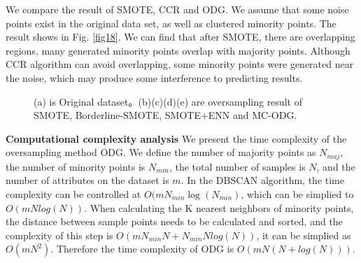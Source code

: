 \documentclass[ida]{iosart2x}
\begin{document}
We compare the result of SMOTE, CCR and ODG. We assume that some noise points exist in the original data set, 
as well as clustered minority points. The result shows in Fig. \ref{fig18}. 
We can find that after SMOTE, there are overlapping regions, many generated minority points 
overlap with majority points.
Although CCR algorithm can avoid overlapping, 
some minority points were generated near the noise, which may produce some interference to predicting results.
\begin{figure}[tb]
  \centering
  \quad
  \quad

  \quad
  \quad
  \caption{(a) is Original dataset。(b)(c)(d)(e) are oversampling result of SMOTE, 
  Borderline-SMOTE, SMOTE+ENN and MC-ODG.}
  \label{fig17}
  \end{figure}

\textbf{Computational complexity analysis}
We present the time complexity of the oversampling method ODG.
We define the number of majority points as $N_{maj}$, 
the number of minority points is $N_{min}$, the total number of samples is $N$, 
and the number of attributes on the dataset is $m$.
In the DBSCAN algorithm, the time complexity can be controlled at $O(mN_{min}\log(N_{min})$,
which can be simplied to $O(mNlog(N))$.
When calculating the K nearest neighbors of minority points,
the distance between sample points needs to be calculated and sorted, and the complexity of this step is
$O(mN_{min}N+N_{min}Nlog(N))$, it can be simplied as $O(mN^2)$. Therefore the time complexity of
ODG is $O(mN(N+log(N)))$.
\end{document}
